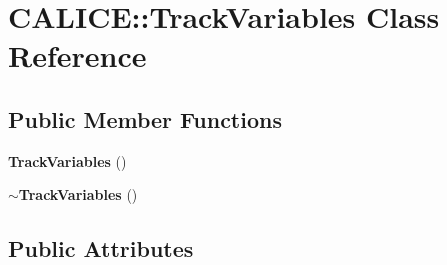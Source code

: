 \section{C\-A\-L\-I\-C\-E\-:\-:Track\-Variables Class Reference}
\label{classCALICE_1_1TrackVariables}
\subsection*{Public Member Functions}
\begin{DoxyCompactItemize}
\item 
{\bf Track\-Variables} ()
\item 
{\bf $\sim$\-Track\-Variables} ()
\end{DoxyCompactItemize}
\subsection*{Public Attributes}
